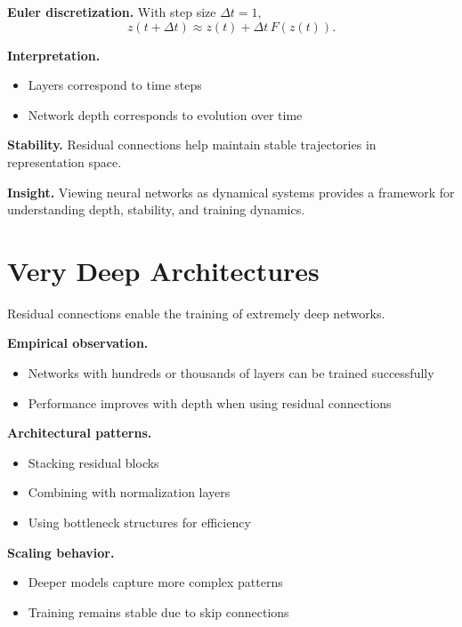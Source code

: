 \medskip

\noindent
\textbf{Euler discretization.}  
With step size $\Delta t = 1$,
\[
z(t + \Delta t) \approx z(t) + \Delta t \, F(z(t)).
\]

\medskip

\noindent
\textbf{Interpretation.}
\begin{itemize}
    \item Layers correspond to time steps
    \item Network depth corresponds to evolution over time
\end{itemize}

\medskip

\noindent
\textbf{Stability.}  
Residual connections help maintain stable trajectories in representation space.

\medskip

\noindent
\textbf{Insight.}  
Viewing neural networks as dynamical systems provides a framework for understanding depth, stability, and training dynamics.

\section{Very Deep Architectures}

Residual connections enable the training of extremely deep networks.

\medskip

\noindent
\textbf{Empirical observation.}
\begin{itemize}
    \item Networks with hundreds or thousands of layers can be trained successfully
    \item Performance improves with depth when using residual connections
\end{itemize}

\medskip

\noindent
\textbf{Architectural patterns.}
\begin{itemize}
    \item Stacking residual blocks
    \item Combining with normalization layers
    \item Using bottleneck structures for efficiency
\end{itemize}

\medskip

\noindent
\textbf{Scaling behavior.}
\begin{itemize}
    \item Deeper models capture more complex patterns
    \item Training remains stable due to skip connections
\end{itemize}

